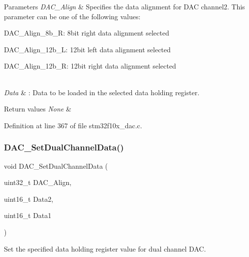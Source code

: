 \begin{DoxyParams}{Parameters}
{\em D\+A\+C\+\_\+\+Align} & Specifies the data alignment for D\+AC channel2. This parameter can be one of the following values\+: \begin{DoxyItemize}
\item D\+A\+C\+\_\+\+Align\+\_\+8b\+\_\+R\+: 8bit right data alignment selected \item D\+A\+C\+\_\+\+Align\+\_\+12b\+\_\+L\+: 12bit left data alignment selected \item D\+A\+C\+\_\+\+Align\+\_\+12b\+\_\+R\+: 12bit right data alignment selected \end{DoxyItemize}
\\
\hline
{\em Data} & \+: Data to be loaded in the selected data holding register. \\
\hline
\end{DoxyParams}

\begin{DoxyRetVals}{Return values}
{\em None} & \\
\hline
\end{DoxyRetVals}


Definition at line 367 of file stm32f10x\+\_\+dac.\+c.

\mbox{\label{group___d_a_c___private___functions_ga4ca2cfdf56ab35a23f2517f23d7fbb24}} 
\subsubsection{\texorpdfstring{D\+A\+C\+\_\+\+Set\+Dual\+Channel\+Data()}{DAC\_SetDualChannelData()}}
{\footnotesize\ttfamily void D\+A\+C\+\_\+\+Set\+Dual\+Channel\+Data (\begin{DoxyParamCaption}\item[{uint32\+\_\+t}]{D\+A\+C\+\_\+\+Align,  }\item[{uint16\+\_\+t}]{Data2,  }\item[{uint16\+\_\+t}]{Data1 }\end{DoxyParamCaption})}



Set the specified data holding register value for dual channel D\+AC. 


